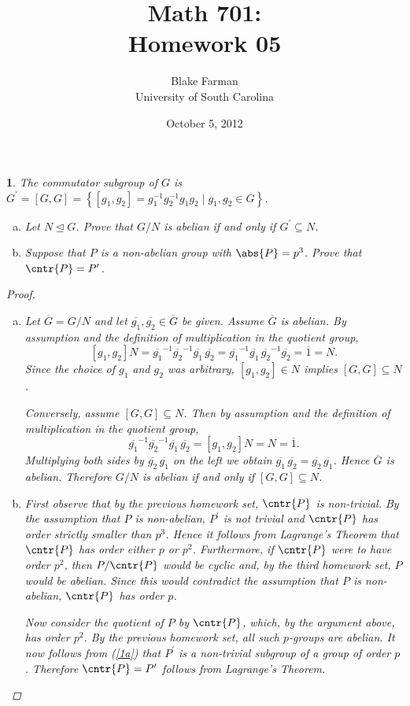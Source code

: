 \documentclass[10pt]{amsart}
\author{Blake Farman\\University of South Carolina}
\title{Math 701:\\Homework 05}
\date{October 5, 2012}
\begin{document}
\maketitle

\newtheorem{thm}{}
\newtheorem{lem}{Lemma}

\begin{thm}
  The commutator subgroup of $G$ is $G^{\prime} = [G,G] = \left\{[g_1,g_2] = g_1^{-1}g_2^{-1}g_1g_2 \mid g_1,g_2 \in G\right\}$.
  \begin{enumerate}[(a)]
  \item
    Let $N \unlhd G$.  Prove that $G/N$ is abelian if and only if $G^\prime \subseteq N$.
  \item
    Suppose that $P$ is a non-abelian group with $\abs{P} = p^3$.
    Prove that $\cntr{P} = P^\prime$.
  \end{enumerate}
  \begin{proof}
    \begin{enumerate}[(a)]
    \item\label{1a}
      Let $\overline{G} = G/N$ and let $\overline{g_1}, \overline{g_2} \in \overline{G}$ be given.
      Assume $\overline{G}$ is abelian.
      By assumption and the definition of multiplication in the quotient group, $$[g_1,g_2]N = \overline{g_1}^{-1}\overline{g_2}^{-1}\overline{g_1}\,\overline{g_2} = \overline{g_1}^{-1}\overline{g_1}\,\overline{g_2}^{-1}\overline{g_2} = \overline{1} = N.$$
      Since the choice of $g_1$ and $g_2$ was arbitrary, $[g_1,g_2] \in N$ implies $[G,G] \subseteq N$.
      
      Conversely, assume $[G,G] \subseteq N$.
      Then by assumption and the definition of multiplication in the quotient group, $$\overline{g_1}^{-1}\overline{g_2}^{-1}\overline{g_1}\,\overline{g_2} = [g_1,g_2]N = N = \overline{1}.$$
      Multiplying both sides by $\overline{g_2}\,\overline{g_1}$ on the left we obtain $\overline{g_1}\,\overline{g_2} = \overline{g_2}\,\overline{g_1}$.
      Hence $\overline{G}$ is abelian.
      Therefore $G/N$ is abelian if and only if $[G,G] \subseteq N$.
    \item
      First observe that by the previous homework set, $\cntr{P}$ is non-trivial. 
      By the assumption that $P$ is non-abelian, $P^\prime$ is not trivial and $\cntr{P}$ has order strictly smaller than $p^3$.
      Hence it follows from Lagrange's Theorem that $\cntr{P}$ has order either $p$ or $p^2$.
      Furthermore, if $\cntr{P}$ were to have order $p^2$, then $P/\cntr{P}$ would be cyclic and, by the third homework set, $P$ would be abelian.
      Since this would contradict the assumption that $P$ is non-abelian, $\cntr{P}$ has order $p$.
      
      Now consider the quotient of $P$ by $\cntr{P}$, which, by the argument above, has order $p^2$.
      By the previous homework set, all such $p$-groups are abelian.
      It now follows from (\ref{1a}) that $P^\prime$ is a non-trivial subgroup of a group of order $p$.
      Therefore $\cntr{P} = P^\prime$ follows from Lagrange's Theorem.
    \end{enumerate}
  \end{proof}
\end{thm}
\end{document}
